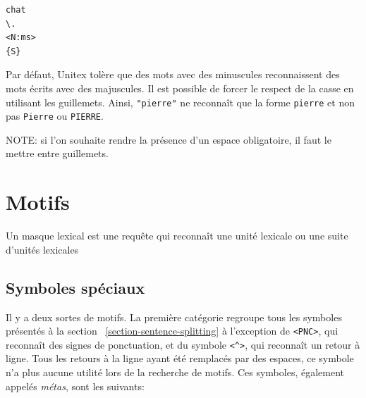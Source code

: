 \begin{verbatim}
chat
\.
<N:ms>
{S}
\end{verbatim}

\noindent Par défaut, Unitex tolère que des mots avec des minuscules reconnaissent des mots écrits
avec des majuscules. Il est possible de forcer le respect de la casse en utilisant les guillemets.
Ainsi, \verb+"pierre"+ ne reconnaît que la forme \verb+pierre+ et non pas \verb+Pierre+ ou \verb+PIERRE+.

\bigskip
\noindent NOTE: si l’on souhaite rendre la présence d’un espace obligatoire, il faut le mettre entre
guillemets.



\section{Motifs}
Un masque lexical est une requête qui reconnaît une unité lexicale ou une suite d'unités lexicales

\subsection{Symboles spéciaux}
\label{section-special-symbols}

Il y a deux sortes de motifs. La première catégorie regroupe tous les symboles présentés à la
section ~\ref{section-sentence-splitting} à l’exception de \verb$<PNC>$, qui reconnaît des signes de
ponctuation, et du symbole \verb+<^>+, qui reconnaît un retour à ligne. Tous les retours à la ligne
ayant été remplacés par des espaces, ce symbole n’a plus aucune utilité lors de la recherche de
motifs. Ces symboles, également appelés \textit{métas}, sont les suivants:


